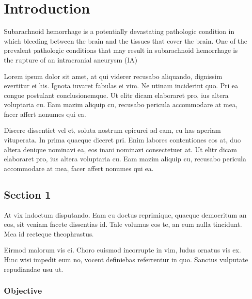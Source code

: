 \cleartooddpage[\thispagestyle{empty}]
\chapter{Introduction}\label{CHAPTER1}

Subarachnoid hemorrhage is a potentially devastating pathologic condition in which bleeding between the brain and the tissues that cover the brain. One of the prevalent pathologic conditions that may result in subarachnoid hemorrhage is the rupture of an intracranial aneurysm (IA)

Lorem ipsum dolor sit amet, at qui viderer recusabo aliquando, dignissim 
evertitur ei his. Ignota iuvaret fabulas ei vim. Ne utinam inciderint quo. 
Pri ea congue postulant conclusionemque. Ut elitr dicam elaboraret pro, ius 
altera voluptaria cu. Eam mazim aliquip cu, recusabo pericula accommodare at 
mea, facer affert nonumes qui ea.

Discere dissentiet vel et, soluta nostrum epicurei ad eam, cu has aperiam 
vituperata. In prima quaeque diceret pri. Enim labores contentiones eos at, 
duo altera denique nominavi ea, eos inani nominavi consectetuer at. Ut elitr 
dicam elaboraret pro, ius altera voluptaria cu. Eam mazim aliquip cu, 
recusabo pericula accommodare at mea, facer affert nonumes qui ea.
\cite{Crystal09_01,DMOL3_01,HPL_DGEMM_02}

\section{Section 1}\label{CHAPTER1_SECTION1}

At vix indoctum disputando. Eam cu doctus reprimique, quaeque democritum 
an eos, sit veniam facete dissentias id. Tale volumus eos te, an eum nulla 
tincidunt. Mea id recteque theophrastus.

Eirmod malorum vis ei. Choro euismod incorrupte in vim, ludus ornatus vis ex. 
Hinc wisi impedit eum no, vocent definiebas referrentur in quo. Sanctus 
vulputate repudiandae usu ut.

\subsection{Objective}\label{CHAPTER1_SECTION1_SUBSECTION1}

